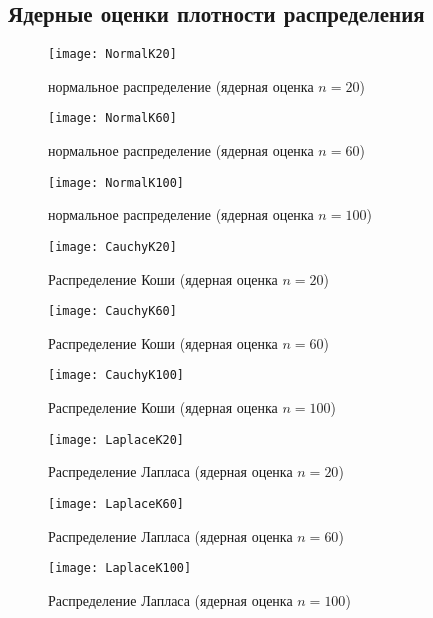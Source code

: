 \documentclass[a4paper]{article}
\begin{document}
\subsection{Ядерные оценки плотности распределения}
\begin{figure}[H]
	\centering
	\texttt{[image: NormalK20]}
	\caption{нормальное распределение (ядерная оценка $n=20$)} 
	\label{fig:normKDE20}
\end{figure}

\begin{figure}[H]
	\centering
	\texttt{[image: NormalK60]}
	\caption{нормальное распределение (ядерная оценка $n=60$)} 
	\label{fig:normKDE60}
\end{figure}

\begin{figure}[H]
	\centering
	\texttt{[image: NormalK100]}
	\caption{нормальное распределение (ядерная оценка $n=100$)} 
	\label{fig:normKDE100}
\end{figure}

\begin{figure}[H]
	\centering
	\texttt{[image: CauchyK20]}
	\caption{Распределение Коши (ядерная оценка $n=20$)} 
	\label{fig:cauchyKDE20}
\end{figure}

\begin{figure}[H]
	\centering
	\texttt{[image: CauchyK60]}
	\caption{Распределение Коши (ядерная оценка $n=60$)} 
	\label{fig:cauchyKDE60}
\end{figure}

\begin{figure}[H]
	\centering
	\texttt{[image: CauchyK100]}
	\caption{Распределение Коши (ядерная оценка $n=100$)} 
	\label{fig:cauchyKDE100}
\end{figure}

\begin{figure}[H]
	\centering
	\texttt{[image: LaplaceK20]}
	\caption{Распределение Лапласа (ядерная оценка $n=20$)} 
	\label{fig:laplaceKDE20}
\end{figure}

\begin{figure}[H]
	\centering
	\texttt{[image: LaplaceK60]}
	\caption{Распределение Лапласа (ядерная оценка $n=60$)} 
	\label{fig:laplaceKDE60}
\end{figure}

\begin{figure}[H]
	\centering
	\texttt{[image: LaplaceK100]}
	\caption{Распределение Лапласа (ядерная оценка $n=100$)} 
	\label{fig:laplaceKDE100}
\end{figure}
\end{document}
